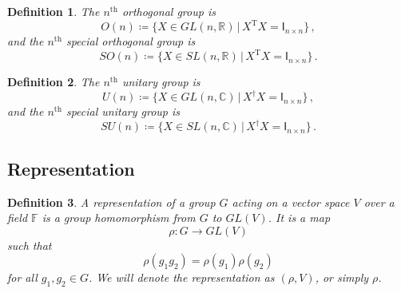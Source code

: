 \documentclass{article}
\theoremstyle{plain}\theoremheaderfont{\normalfont\itshape}\theorembodyfont{\rmfamily}\theoremseparator{.}\newtheorem*{rem}{Remark}\newtheorem*{ex}{Example}\newtheorem*{proof}{Proof}\newtheorem*{altp}{Alternative proof}
\theoremstyle{plain}\theoremheaderfont{\normalfont\bfseries}\theorembodyfont{\rmfamily}\theoremseparator{.}\newtheorem{thm}{Theorem}[section]\newtheorem{lem}[thm]{Lemma}\newtheorem{prop}[thm]{Proposition}\newtheorem*{cor}{Corollary}\newtheorem{defn}[thm]{Definition}\newtheorem{clm}[thm]{Claim}\newtheorem{clminproof}{Claim}
\theoremstyle{break}\theoremheaderfont{\normalfont\itshape}\theorembodyfont{\rmfamily}\theoremseparator{.\medskip}\newtheorem*{proofskip}{Proof}\newtheorem*{exs}{Examples}\newtheorem*{rems}{Remarks}
\theoremstyle{break}\theoremheaderfont{\normalfont\bfseries}\theorembodyfont{\rmfamily}\theoremseparator{.\medskip}\newtheorem{lemskip}[thm]{Lemma}\newtheorem{defnskip}[thm]{Definition}\newtheorem{propskip}[thm]{Proposition}\newtheorem{thmskip}[thm]{Theorem}
\numberwithin{equation}{section}
\newcommand{\tp}{^\mathrm{T}}
\begin{document}
	\begin{defn}
		The \textit{\(n^\text{th}\) orthogonal group} is
		\[O(n)\coloneqq\{X\in GL(n,\mathbb{R})\,|\,X\tp X=\mathsf{I}_{n\times n}\}\,,\]
		and the \textit{\(n^\text{th}\) special orthogonal group} is
		\[SO(n)\coloneqq\{X\in SL(n,\mathbb{R})\,|\,X\tp X=\mathsf{I}_{n\times n}\}\,.\]
	\end{defn}
	\begin{defn}
		The \textit{\(n^\text{th}\) unitary group} is
		\[U(n)\coloneqq\{X\in GL(n,\mathbb{C})\,|\,X^\dagger X=\mathsf{I}_{n\times n}\}\,,\]
		and the \textit{\(n^\text{th}\) special unitary group} is
		\[SU(n)\coloneqq\{X\in SL(n,\mathbb{C})\,|\,X^\dagger X=\mathsf{I}_{n\times n}\}\,.\]
	\end{defn}
	
	\subsection{Representation}
	\begin{defn}
		A \textit{representation} of a group \(G\) acting on a vector space \(V\) over a field \(\mathbb{F}\) is a group homomorphism from \(G\) to \(GL(V)\). It is a map
		\[\rho: G\to GL(V)\]
		such that
		\[\rho(g_1g_2)=\rho(g_1)\rho(g_2)\]
		for all \(g_1,g_2\in G\). We will denote the representation as \((\rho,V)\), or simply \(\rho\).
	\end{defn}
\end{document}
